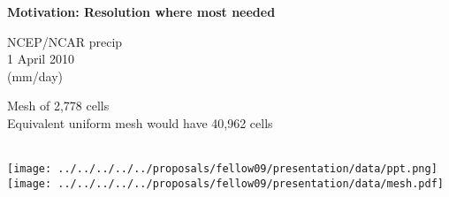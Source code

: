 \begin{slide}{}

\begin{minipage}[t]{0.24\linewidth}\raggedright

{\Large\bf
Motivation: Resolution where most needed
}

\vspace{0.5in}

NCEP/NCAR precip\\
1 April 2010\\
(mm/day)

\vspace{2.5in}

Mesh of 2,778 cells\\
Equivalent uniform mesh would have 40,962 cells\\

\end{minipage}
%
\begin{minipage}[t]{0.75\linewidth}\raggedright\ \\ \vspace{-0.1in}
\texttt{[image: ../../../../../proposals/fellow09/presentation/data/ppt.png]}
\texttt{[image: ../../../../../proposals/fellow09/presentation/data/mesh.pdf]}
\end{minipage}


\end{slide}

